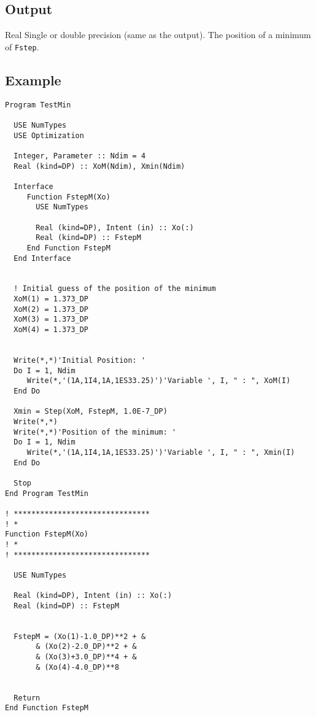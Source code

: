 \subsection{Output}

Real Single or double precision (same as the output). The position of
a minimum of \texttt{Fstep}.

\subsection{Example}

\begin{verbatim}
Program TestMin

  USE NumTypes
  USE Optimization

  Integer, Parameter :: Ndim = 4
  Real (kind=DP) :: XoM(Ndim), Xmin(Ndim)
  
  Interface
     Function FstepM(Xo)
       USE NumTypes
       
       Real (kind=DP), Intent (in) :: Xo(:)
       Real (kind=DP) :: FstepM
     End Function FstepM
  End Interface
  

  ! Initial guess of the position of the minimum
  XoM(1) = 1.373_DP
  XoM(2) = 1.373_DP
  XoM(3) = 1.373_DP
  XoM(4) = 1.373_DP
  

  Write(*,*)'Initial Position: '
  Do I = 1, Ndim
     Write(*,'(1A,1I4,1A,1ES33.25)')'Variable ', I, " : ", XoM(I)
  End Do
  
  Xmin = Step(XoM, FstepM, 1.0E-7_DP)
  Write(*,*)
  Write(*,*)'Position of the minimum: '
  Do I = 1, Ndim
     Write(*,'(1A,1I4,1A,1ES33.25)')'Variable ', I, " : ", Xmin(I)
  End Do

  Stop
End Program TestMin

! *******************************
! *
Function FstepM(Xo)
! *
! *******************************

  USE NumTypes
  
  Real (kind=DP), Intent (in) :: Xo(:)
  Real (kind=DP) :: FstepM

  
  FstepM = (Xo(1)-1.0_DP)**2 + &
       & (Xo(2)-2.0_DP)**2 + &
       & (Xo(3)+3.0_DP)**4 + &
       & (Xo(4)-4.0_DP)**8 


  Return
End Function FstepM
\end{verbatim}




